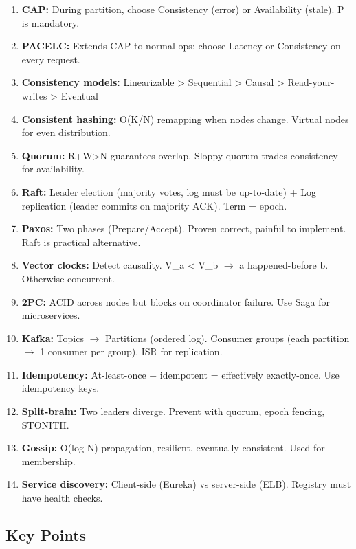 \documentclass[11pt]{article}
\providecommand{\tightlist}{\setlength{\itemsep}{1pt}\setlength{\parskip}{0pt}}
\begin{document}
\begin{enumerate}
\def\labelenumi{\arabic{enumi}.}
\tightlist
\item
  \textbf{CAP:} During partition, choose Consistency (error) or Availability (stale). P is mandatory.
\item
  \textbf{PACELC:} Extends CAP to normal ops: choose Latency or Consistency on every request.
\item
  \textbf{Consistency models:} Linearizable \textgreater{} Sequential \textgreater{} Causal \textgreater{} Read-your-writes \textgreater{} Eventual
\item
  \textbf{Consistent hashing:} O(K/N) remapping when nodes change. Virtual nodes for even distribution.
\item
  \textbf{Quorum:} R+W\textgreater N guarantees overlap. Sloppy quorum trades consistency for availability.
\item
  \textbf{Raft:} Leader election (majority votes, log must be up-to-date) + Log replication (leader commits on majority ACK). Term = epoch.
\item
  \textbf{Paxos:} Two phases (Prepare/Accept). Proven correct, painful to implement. Raft is practical alternative.
\item
  \textbf{Vector clocks:} Detect causality. V\_a \textless{} V\_b \(\rightarrow\) a happened-before b. Otherwise concurrent.
\item
  \textbf{2PC:} ACID across nodes but blocks on coordinator failure. Use Saga for microservices.
\item
  \textbf{Kafka:} Topics \(\rightarrow\) Partitions (ordered log). Consumer groups (each partition \(\rightarrow\) 1 consumer per group). ISR for replication.
\item
  \textbf{Idempotency:} At-least-once + idempotent = effectively exactly-once. Use idempotency keys.
\item
  \textbf{Split-brain:} Two leaders diverge. Prevent with quorum, epoch fencing, STONITH.
\item
  \textbf{Gossip:} O(log N) propagation, resilient, eventually consistent. Used for membership.
\item
  \textbf{Service discovery:} Client-side (Eureka) vs server-side (ELB). Registry must have health checks.
\end{enumerate}

\subsection{Key Points}\label{key-points}
\end{document}
